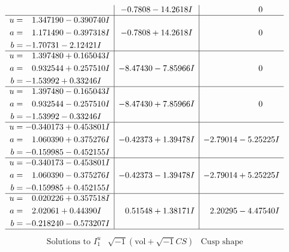 \documentclass[1p]{elsarticle_modified}
\theoremstyle{definition}
\newcommand{\I}{\sqrt{-1}}
\begin{document}
$$\begin{array}{c|c|c}
 & -0.7808 - 14.2618 I & \phantom{-0.000000 } 0 \\ \hline\begin{aligned}
u &= \phantom{-}1.347190 - 0.390740 I \\
a &= \phantom{-}1.171490 - 0.397318 I \\
b &= -1.70731 - 2.12421 I\end{aligned}
 & -0.7808 + 14.2618 I & \phantom{-0.000000 } 0 \\ \hline\begin{aligned}
u &= \phantom{-}1.397480 + 0.165043 I \\
a &= \phantom{-}0.932544 + 0.257510 I \\
b &= -1.53992 + 0.33246 I\end{aligned}
 & -8.47430 - 7.85966 I & \phantom{-0.000000 } 0 \\ \hline\begin{aligned}
u &= \phantom{-}1.397480 - 0.165043 I \\
a &= \phantom{-}0.932544 - 0.257510 I \\
b &= -1.53992 - 0.33246 I\end{aligned}
 & -8.47430 + 7.85966 I & \phantom{-0.000000 } 0 \\ \hline\begin{aligned}
u &= -0.340173 + 0.453801 I \\
a &= \phantom{-}1.060390 + 0.375276 I \\
b &= -0.159985 - 0.452155 I\end{aligned}
 & -0.42373 + 1.39478 I & -2.79014 - 5.25225 I \\ \hline\begin{aligned}
u &= -0.340173 - 0.453801 I \\
a &= \phantom{-}1.060390 - 0.375276 I \\
b &= -0.159985 + 0.452155 I\end{aligned}
 & -0.42373 - 1.39478 I & -2.79014 + 5.25225 I \\ \hline\begin{aligned}
u &= \phantom{-}0.020226 + 0.357518 I \\
a &= \phantom{-}2.02061 + 0.44390 I \\
b &= -0.218240 - 0.573207 I\end{aligned}
 & \phantom{-}0.51548 + 1.38171 I & \phantom{-}2.20295 - 4.47540 I\\
 \hline 
 \end{array}$$\newpage$$\begin{array}{c|c|c}  
\text{Solutions to }I^u_{1}& \I (\text{vol} + \sqrt{-1}CS) & \text{Cusp shape}\\

\end{array}$$
\end{document}
